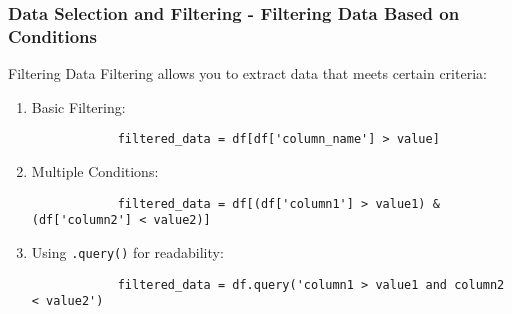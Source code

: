 \documentclass[aspectratio=169]{beamer}
\begin{document}
\begin{frame}[fragile]
    \frametitle{Data Selection and Filtering - Filtering Data Based on Conditions}
    \begin{block}{Filtering Data}
        Filtering allows you to extract data that meets certain criteria:
        \begin{enumerate}
            \item Basic Filtering:
            \begin{lstlisting}
            filtered_data = df[df['column_name'] > value]
            \end{lstlisting}

            \item Multiple Conditions:
            \begin{lstlisting}
            filtered_data = df[(df['column1'] > value1) & (df['column2'] < value2)]
            \end{lstlisting}

            \item Using \texttt{.query()} for readability:
            \begin{lstlisting}
            filtered_data = df.query('column1 > value1 and column2 < value2')
            \end{lstlisting}
        \end{enumerate}
    \end{block}
\end{frame}
\end{document}
